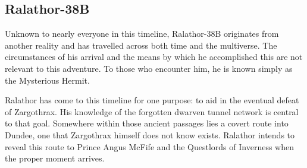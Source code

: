 \subsection*{Ralathor-38B}
{\entryfont Unknown to nearly everyone in this timeline, Ralathor-38B originates from another reality and has travelled across both time and the multiverse. The circumstances of his arrival and the means by which he accomplished this are not relevant to this adventure. To those who encounter him, he is known simply as the Mysterious Hermit.

Ralathor has come to this timeline for one purpose: to aid in the eventual defeat of Zargothrax. His knowledge of the forgotten dwarven tunnel network is central to that goal. Somewhere within those ancient passages lies a covert route into Dundee, one that Zargothrax himself does not know exists. Ralathor intends to reveal this route to Prince Angus McFife and the Questlords of Inverness when the proper moment arrives.}
